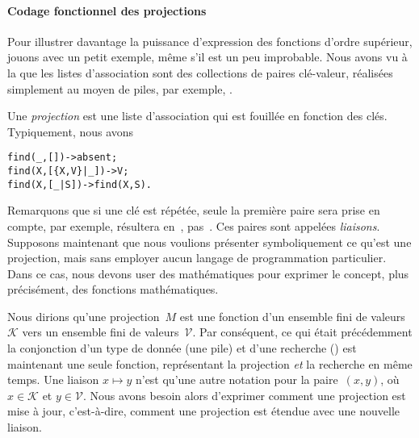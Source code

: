 \paragraph{Codage fonctionnel des projections}

Pour illustrer davantage la puissance d'expression des fonctions
d'ordre supérieur, jouons avec un petit exemple, même s'il est un peu
improbable. Nous avons vu à la  que
les listes d'association sont des collections de paires clé-valeur,
réalisées simplement au moyen de piles, par exemple,
\erlcode{[\{a,0\},\{b,1\},\{a,5\}]}.

Une \emph{projection} est une liste d'association qui est fouillée en
fonction des clés. Typiquement, nous avons
\begin{alltt}
find(_,       []) -> absent;
find(X,[\{X,V\}|\_]) -> V;\hfill% \emph{Valeur associée trouvée}
find(X,    [\_|S]) -> find(X,S).\hfill% \emph{La recherche continue}
\end{alltt}
Remarquons que si une clé est répétée, seule la première paire sera
prise en compte, par exemple,
 résultera en~,
pas~. Ces paires sont appelées \emph{liaisons}. Supposons
maintenant que nous voulions présenter symboliquement ce qu'est une
projection, mais sans employer aucun langage de programmation
particulier. Dans ce cas, nous devons user des mathématiques pour
exprimer le concept, plus précisément, des fonctions mathématiques.

Nous dirions qu'une projection~\(M\) est une fonction d'un ensemble
fini de valeurs~\(\mathcal{K}\) vers un ensemble fini de
valeurs~\(\mathcal{V}\). Par conséquent, ce qui était précédemment la
conjonction d'un type de donnée (une pile) et d'une recherche
() est maintenant une seule fonction, représentant la
projection \emph{et} la recherche en même temps. Une liaison \(x
\mapsto y\) n'est qu'une autre notation pour la paire~\((x, y)\), où
\(x \in \mathcal{K}\) et \(y \in \mathcal{V}\). Nous avons besoin
alors d'exprimer comment une projection est mise à jour, c'est-à-dire,
comment une projection est étendue avec une nouvelle liaison.

